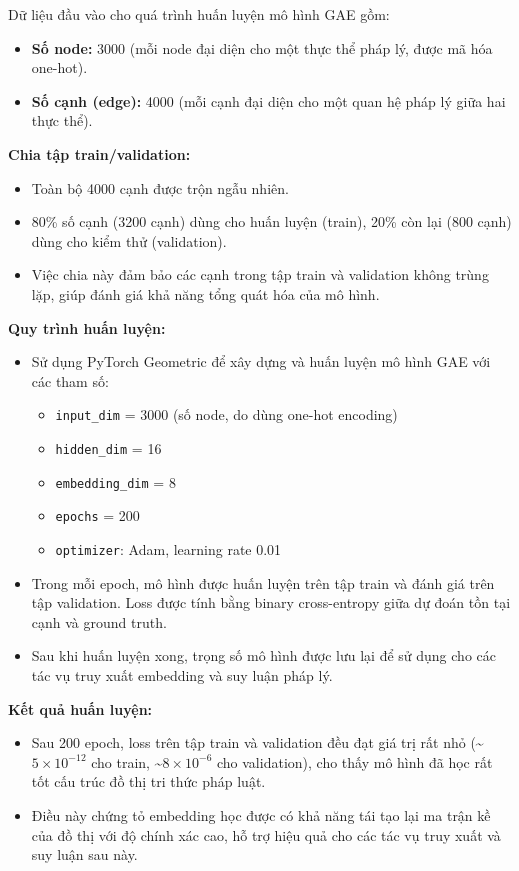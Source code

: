 \documentclass[a4paper]{article}
\begin{document}
Dữ liệu đầu vào cho quá trình huấn luyện mô hình GAE gồm:
\begin{itemize}
    \item \textbf{Số node:} 3000 (mỗi node đại diện cho một thực thể pháp lý, được mã hóa one-hot).
    \item \textbf{Số cạnh (edge):} 4000 (mỗi cạnh đại diện cho một quan hệ pháp lý giữa hai thực thể).
\end{itemize}

\textbf{Chia tập train/validation:}
\begin{itemize}
    \item Toàn bộ 4000 cạnh được trộn ngẫu nhiên.
    \item 80\% số cạnh (3200 cạnh) dùng cho huấn luyện (train), 20\% còn lại (800 cạnh) dùng cho kiểm thử (validation).
    \item Việc chia này đảm bảo các cạnh trong tập train và validation không trùng lặp, giúp đánh giá khả năng tổng quát hóa của mô hình.
\end{itemize}

\textbf{Quy trình huấn luyện:}
\begin{itemize}
    \item Sử dụng PyTorch Geometric để xây dựng và huấn luyện mô hình GAE với các tham số:
    \begin{itemize}
        \item \texttt{input\_dim} = 3000 (số node, do dùng one-hot encoding)
        \item \texttt{hidden\_dim} = 16
        \item \texttt{embedding\_dim} = 8
        \item \texttt{epochs} = 200
        \item \texttt{optimizer}: Adam, learning rate 0.01
    \end{itemize}
    \item Trong mỗi epoch, mô hình được huấn luyện trên tập train và đánh giá trên tập validation. Loss được tính bằng binary cross-entropy giữa dự đoán tồn tại cạnh và ground truth.
    \item Sau khi huấn luyện xong, trọng số mô hình được lưu lại để sử dụng cho các tác vụ truy xuất embedding và suy luận pháp lý.
\end{itemize}

\textbf{Kết quả huấn luyện:}
\begin{itemize}
    \item Sau 200 epoch, loss trên tập train và validation đều đạt giá trị rất nhỏ (\textasciitilde$5 \times 10^{-12}$ cho train, \textasciitilde$8 \times 10^{-6}$ cho validation), cho thấy mô hình đã học rất tốt cấu trúc đồ thị tri thức pháp luật.
    \item Điều này chứng tỏ embedding học được có khả năng tái tạo lại ma trận kề của đồ thị với độ chính xác cao, hỗ trợ hiệu quả cho các tác vụ truy xuất và suy luận sau này.
\end{itemize}
\end{document}
